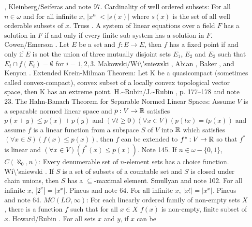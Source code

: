 \cite{1952}, \ac{Kleinberg/Seiferas} \cite{1973} and note 97.
\medskip
{}  Cardinality of well ordered subsets:  For all
$n\in\omega$ and for all infinite $x$, $|x^n| < |s(x)|$ where $s(x)$ is
the set of all well orderable subsets of $x$.  \ac{Truss} \cite{1973d}.
\medskip
{}  A system of linear equations over a field
$F$ has a solution in $F$ if and only if every finite sub-system
has a solution in $F$. \ac{Cowen/Emerson} \cite{1996}.
\medskip
{}  Let $E$ be a set and $f: E\to E$, then $f$ has
a fixed point if and only if $E$ is not the union of three mutually
disjoint sets $E_1$, $E_2$ and $E_3$ such that $E_i \cap f(E_i) =
\emptyset$ for $i=1, 2, 3$.  \ac{Makowski/Wi\'sniewski} \cite{1969},
\ac{Abian} \cite{1968}, \ac{Baker} \cite{1964}, and \ac{Kenyon}
\cite{1963}.
\medskip
{} Extended Krein-Milman Theorem:  Let K be a
quasicompact (sometimes called convex-compact), convex subset of a
locally convex topological vector space, then K has an extreme point.
\ac{H.~Rubin/J.~Rubin} \cite{1985}, p. 177--178 and note 23.
\medskip
{} The Hahn-Banach Theorem for Separable
Normed Linear Spaces:  Assume $V$ is a separable normed linear space
and $p :V \to \Bbb R$ satisfies $p(x+y) \le p(x) + p(y)$ and
$(\forall t \ge 0)(\forall x \in V)(p(tx) = tp(x))$
and assume $f$ is a linear function from a subspace $S$ of
$V$ into $\Bbb R$ which satisfies $(\forall x \in S)(f(x) \le
p(x))$, then $f$ can be extended to $f^* :V \to \Bbb R$ so that $f^* $
is linear and $(\forall x \in V)(f^*(x) \le p(x))$.  Note 145.
\medskip
{} If $n\in\omega-\{0,1\}$, $C(\aleph_0,n)$:
Every denumerable set of $n$-element sets has a choice function.
\ac{Wi\'sniewski} \cite{1972}.
\medskip
{} If $S$ is a set of subsets of a countable set
and $S$ is closed under chain unions, then $S$ has a $\subseteq$-maximal
element.  \ac{Smullyan} \cite{1994} and note 102.
\medskip
{}  For all infinite $x$, $|2^x|=|x^x|$. \ac{Pincus}
\cite{1978} and note 64.
\medskip
{}  For all infinite $x$, $|x!|=|x^x|$. \ac{Pincus}
\cite{1978} and note 64.
\medskip
{} $MC(LO,\infty)$: For each linearly ordered family
of non-empty sets $X$, there is a function $f$ such that for all $x\in X$
$f(x)$ is non-empty, finite subset of $x$. \ac{Howard/Rubin} \cite{1977}.
\medskip
{}  For all sets $x$ and $y$, if $x$ can be
